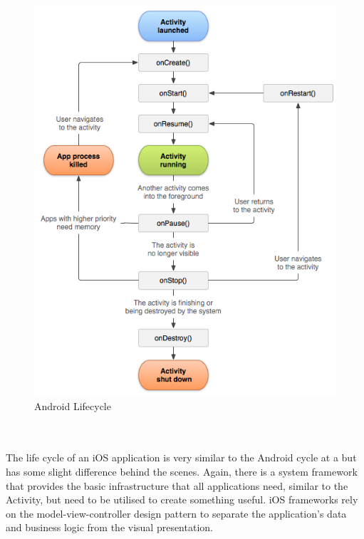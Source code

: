 \documentclass[a4paper]{report}
\begin{document}
\begin{figure}[h]
\centering
\includegraphics[scale=0.4]{activity_lifecycle}
\caption{Android Lifecycle \cite{Android}}
\end{figure}
\\\\
The life cycle of an iOS application is very similar to the Android cycle at a but has some slight difference behind the scenes. Again, there is a system framework that provides the basic infrastructure that all applications need, similar to the Activity, but need to be utilised to create something useful. iOS frameworks rely on the model-view-controller design pattern to separate the application's data and business logic from the visual presentation. \cite{Apple}
\\\\
\end{document}
